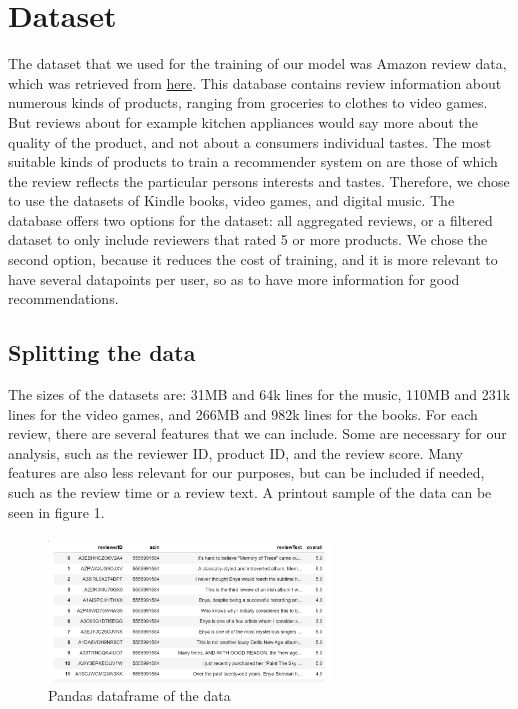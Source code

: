 \documentclass[11pt]{article}
\begin{document}
	\section{Dataset}
	The dataset that we used for the training of our model was Amazon review data, which was retrieved from \href{http://jmcauley.ucsd.edu/data/amazon/}{here}. This database contains review information about numerous kinds of products, ranging from groceries to clothes to video games. But reviews about for example kitchen appliances would say more about the quality of the product, and not about a consumers individual tastes. The most suitable kinds of products to train a recommender system on are those of which the review reflects the particular persons interests and tastes. Therefore, we chose to use the datasets of Kindle books, video games, and digital music. The database offers two options for the dataset: all aggregated reviews, or a filtered dataset to only include reviewers that rated 5 or more products. We chose the second option, because it reduces the cost of training, and it is more relevant to have several datapoints per user, so as to have more information for good recommendations. \\
	
	\subsection{Splitting the data}
	The sizes of the datasets are: 31MB and 64k lines for the music, 110MB and 231k lines for the video games, and 266MB and 982k lines for the books. For each review, there are several features that we can include. Some are necessary for our analysis, such as the reviewer ID, product ID, and the review score. Many features are also less relevant for our purposes, but can be included if needed, such as the review time or a review text. A printout sample of the data can be seen in figure 1. \\
	\begin{figure}
		\includegraphics[width=7.5cm]{Pandas_df_example.png}
		\caption{Pandas dataframe of the data}
	\end{figure}
	
\end{document}
